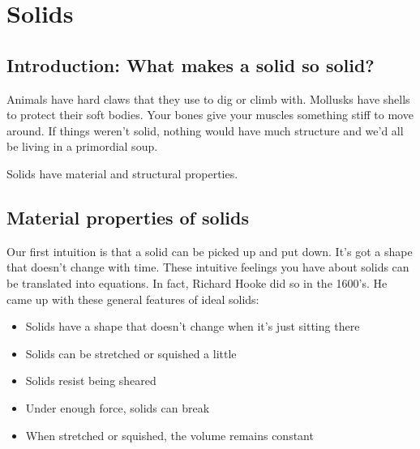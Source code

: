 

\chapter{Solids}
\label{ch:Solids}

\section{Introduction: What makes a solid so solid?}
 Animals have hard claws that they use to dig or climb with. Mollusks have shells to protect their soft bodies. Your bones give your muscles something stiff to move around. If things weren't solid, nothing would have much structure and we'd all be living in a primordial soup.

Solids have material and structural properties.

\section{Material properties of solids} %
 Our first intuition is that a solid can be picked up and put down. It's got a shape that doesn't change with time. These intuitive feelings you have about solids can be translated into equations. In fact, Richard Hooke did so in the 1600's. He came up with these general features of ideal solids: 

\begin{itemize}
\item Solids have a shape that doesn't change when it's just sitting there
\item Solids can be stretched or squished a little
\item Solids resist being sheared
\item Under enough force, solids can break
\item When stretched or squished, the volume remains constant
\end{itemize}

